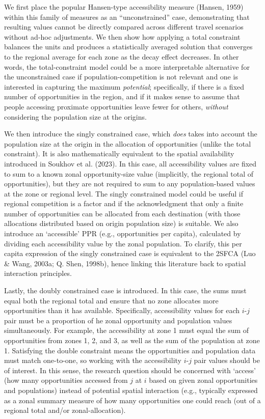 \documentclass[
11pt, %
oneside, %
english, %
singlespacing, %
]{macthesis} %
\begin{document}
We first place the popular Hansen-type accessibility measure (Hansen, 1959) within this family of measures as an ``unconstrained'' case, demonstrating that resulting values cannot be directly compared across different travel scenarios without ad-hoc adjustments. We then show how applying a total constraint balances the units and produces a statistically averaged solution that converges to the regional average for each zone as the decay effect decreases. In other words, the total-constraint model could be a more interpretable alternative for the unconstrained case if population-competition is not relevant and one is interested in capturing the maximum \emph{potential}; specifically, if there is a fixed number of opportunities in the region, and if it makes sense to assume that people accessing proximate opportunities leave fewer for others, \emph{without} considering the population size at the origins.

We then introduce the singly constrained case, which \emph{does} takes into account the population size at the origin in the allocation of opportunities (unlike the total constraint). It is also mathematically equivalent to the spatial availability introduced in Soukhov et al. (2023). In this case, all accessibility values are fixed to sum to a known zonal opportunity-size value (implicitly, the regional total of opportunities), but they are not required to sum to any population-based values at the zone or regional level. The singly constrained model could be useful if regional competition is a factor and if the acknowledgment that only a finite number of opportunities can be allocated from each destination (with those allocations distributed based on origin population size) is suitable. We also introduce an `accessible' PPR (e.g., opportunities per capita), calculated by dividing each accessibility value by the zonal population. To clarify, this per capita expression of the singly constrained case is equivalent to the 2SFCA (Luo \& Wang, 2003a; Q. Shen, 1998b), hence linking this literature back to spatial interaction principles.

Lastly, the doubly constrained case is introduced. In this case, the sums must equal both the regional total and ensure that no zone allocates more opportunities than it has available. Specifically, accessibility values for each \(i\)-\(j\) pair must be a proportion of he zonal opportunity and population values simultaneously. For example, the accessibility at zone 1 must equal the sum of opportunities from zones 1, 2, and 3, as well as the sum of the population at zone 1. Satisfying the double constraint means the opportunities and population data must match one-to-one, so working with the accessibility \(i\)-\(j\) pair values should be of interest. In this sense, the research question should be concerned with `access' (how many opportunities accessed from \(j\) at \(i\) based on given zonal opportunities and populations) instead of potential spatial interaction (e.g., typically expressed as a zonal summary measure of how many opportunities one could reach (out of a regional total and/or zonal-allocation).
\end{document}
